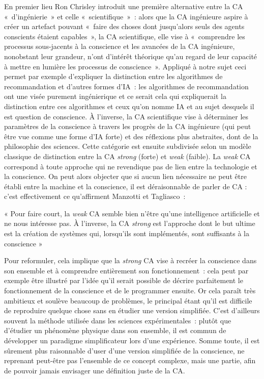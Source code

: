 \documentclass[a4paper, titlepage, 12pt]{article}
\newenvironment{longquote}%
{\vspace{-9pt}\begin{center}\begin{minipage}{120mm}\singlespacing\footnotesize «}%
{»\end{minipage}\end{center}\vspace{9pt}}
\begin{document}
	En premier lieu Ron Chrisley introduit une première alternative entre la CA «~d'ingénierie~» et celle «~scientifique~»~: alors que la CA ingénieure aspire à créer un artefact pouvant «~faire des choses dont jusqu’alors seuls des agents conscients étaient capables~», la CA scientifique, elle vise à «~comprendre les processus sous-jacents à la conscience et les avancées de la CA ingénieure, nonobstant leur grandeur, n’ont d'intérêt théorique qu’au regard de leur capacité à mettre en lumière les processus de conscience~». Appliqué à notre sujet ceci permet par exemple d’expliquer la distinction entre les algorithmes de recommandation et d’autres formes d’IA~: les algorithmes de recommandation ont une visée purement ingénierique et ce serait cela qui expliquerait la distinction entre ces algorithmes et ceux qu’on nomme IA et au sujet desquels il est question de conscience.  À l’inverse, la CA scientifique vise à déterminer les paramètres de la conscience à travers les progrès de la CA ingénieure (qui peut être vue comme une forme d’IA forte) et des réflexions plus abstraites, dont de la philosophie des sciences. Cette catégorie est ensuite subdivisée selon un modèle classique de distinction entre la CA \textit{strong} (forte) et \textit{weak} (faible). La \textit{weak} CA correspond à toute approche qui ne revendique pas de lien entre la technologie et la conscience. On peut alors objecter que si aucun lien nécessaire ne peut être établi entre la machine et la conscience, il est déraisonnable de parler de CA : c’est effectivement ce qu’affirment Manzotti et Tagliasco~: \cite{manzottiArtificialConsciousnessDiscipline2008}
	\begin{longquote}
		Pour faire court, la \textit{weak} CA semble bien n’être qu’une intelligence artificielle  et ne nous intéresse pas. À l’inverse, la CA \textit{strong} est l’approche dont le but ultime est la création de systèmes qui, lorsqu’ils sont implémentés, sont suffisants à la conscience
	\end{longquote}

	Pour reformuler, cela implique que la \textit{strong} CA vise à recréer la conscience dans son ensemble et à comprendre entièrement son fonctionnement~: cela peut par exemple être illustré par l’idée qu’il serait possible de décrire parfaitement le fonctionnement de la conscience et de le programmer ensuite. Or cela paraît très ambitieux et soulève beaucoup de problèmes, le principal étant qu’il est difficile de reproduire quelque chose sans en étudier une version simplifiée. C’est d’ailleurs souvent la méthode utilisée dans les sciences expérimentales~: plutôt que d’étudier un phénomène physique dans son ensemble, il est commun de développer un paradigme simplificateur lors d’une expérience. Somme toute, il est sûrement plus raisonnable d’user d’une version simplifiée de la conscience, ne reprenant peut-être pas l'ensemble de ce concept complexe, mais une partie, afin de pouvoir jamais envisager une définition juste de la CA. 
\end{document}
